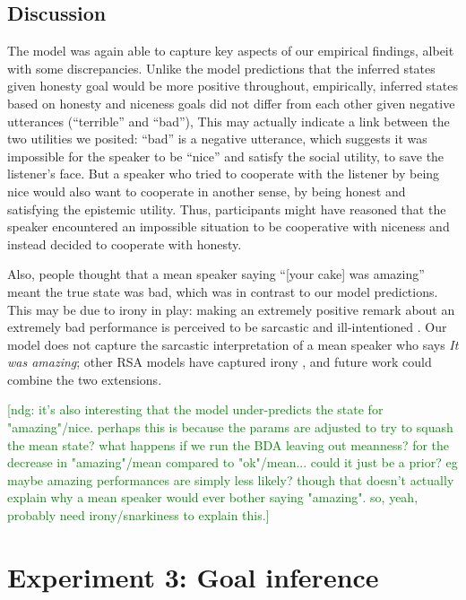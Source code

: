 \documentclass[10pt,letterpaper]{article}
\newcommand{\ndg}[1]{\textcolor{Green}{[ndg: #1]}}
\begin{document}
\subsection{Discussion}

The model was again able to capture key aspects of our empirical findings, albeit with some discrepancies.
Unlike the model predictions that the inferred states given honesty goal would be more positive throughout,
empirically, inferred states based on honesty and niceness goals did not differ from each other given negative utterances (``terrible'' and ``bad''), 
This may actually indicate a link between the two utilities we posited: 
``bad'' is a negative utterance, which suggests it was impossible for the speaker to be ``nice'' and satisfy the social utility, to save the listener's face. 
But a speaker who tried to cooperate with the listener by being nice would also want to cooperate in another sense, by being honest and satisfying the epistemic utility.  
Thus, participants might have reasoned that the speaker encountered an impossible situation to be cooperative with niceness and instead decided to cooperate with honesty. 

Also, people thought that a mean speaker saying ``[your cake] was amazing'' meant the true state was bad, which was in contrast to our model predictions. 
This may be due to irony in play: making an extremely positive remark about an extremely bad performance is perceived to be sarcastic and ill-intentioned \cite{colston1997}. 
Our model does not capture the sarcastic interpretation of a mean speaker who says \emph{It was amazing}; 
other RSA models have captured irony \cite{Kao2015}, and future work could combine the two extensions.

\ndg{it's also interesting that the model under-predicts the state for "amazing"/nice. perhaps this is because the params are adjusted to try to squash the mean state? what happens if we run the BDA leaving out meanness?
for the decrease in "amazing"/mean compared to "ok"/mean... could it just be a prior? eg maybe amazing performances are simply less likely? though that doesn't actually explain why a mean speaker would ever bother saying "amazing". so, yeah, probably need irony/snarkiness to explain this.}

\section{Experiment 3: Goal inference}
\end{document}
